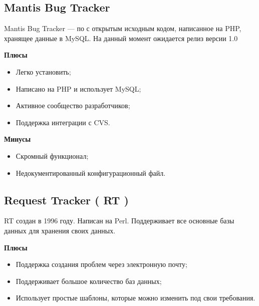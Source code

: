 \subsection{ Mantis Bug Tracker } \label{sect2_16_2}

Mantis Bug Tracker --- по с открытым исходным кодом, написанное на PHP, хранящее данные в MySQL. На данный момент ожидается релиз версии 1.0

\textbf{Плюсы}

\begin{itemize}

\item Легко установить;

\item Написано на PHP  и использует  MySQL;

\item Активное сообщество разработчиков;

\item Поддержка интеграции с CVS.

\end{itemize}


\textbf{Минусы}

\begin{itemize}

\item Скромный функционал;

\item Недокументированный конфигурационный файл.

\end{itemize}

\subsection{ Request Tracker ( RT ) } \label{sect2_16_3}

RT создан в 1996 году. Написан на Perl. Поддерживает все основные базы данных для хранения своих данных.

\textbf{Плюсы}

\begin{itemize}

\item Поддержка создания проблем через электронную почту;

\item Поддерживает большое количество баз данных;

\item Использует простые шаблоны, которые можно изменить под свои требования.

\end{itemize}

